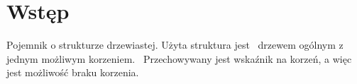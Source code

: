 \hypertarget{index_intro}{}\section{Wstęp}\label{index_intro}
Pojemnik o strukturze drzewiastej. Użyta struktura jest~\newline
drzewem ogólnym z jednym możliwym korzeniem.~\newline
Przechowywany jest wskaźnik na korzeń, a więc~\newline
jest możliwość braku korzenia.~\newline
